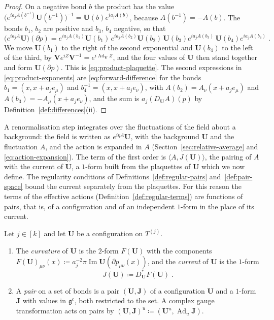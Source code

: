 \documentclass[11pt]{preprint}
\newcommand{\im}{\operatorname{Im}}
\newcommand{\Ad}{\operatorname{Ad}}
\numberwithin{equation}{section}
\begin{document}
\begin{proof}
On a negative bond $b$ the product has the value $\bigl(e^{ia_jA(b^{-1})}\mathbf U(b^{-1})\bigr)^{-1} = \mathbf U(b)e^{ia_jA(b)}$, because $A(b^{-1}) = -A(b)$. The bonds $b_1$, $b_2$ are positive and $b_3$, $b_4$ negative, so that
\[
    \bigl(e^{ia_jA}\mathbf U\bigr)(\partial p) = e^{ia_jA(b_1)}\mathbf U(b_1)\,e^{ia_jA(b_2)}\mathbf U(b_2)\,\mathbf U(b_3)e^{ia_jA(b_3)}\,\mathbf U(b_4)e^{ia_jA(b_4)}\;.
\]
We move $\mathbf U(b_1)$ to the right of the second exponential and $\mathbf U(b_4)$ to the left of the third, by $\mathbf Ve^{iZ}\mathbf V^{-1} = e^{i\Ad_{\mathbf V}Z}$, and the four values of $\mathbf U$ then stand together and form $\mathbf U(\partial p)$. This is \eqref{eq:product-plaquette}. The second expressions in \eqref{eq:product-exponents} are \eqref{eq:forward-difference} for the bonds $b_1 = (x, x + a_je_\mu)$ and $b_4^{-1} = (x, x + a_je_\nu)$, with $A(b_2) = A_\nu(x + a_je_\mu)$ and $A(b_3) = -A_\mu(x + a_je_\nu)$, and the sum is $a_j(D_{\mathbf U}A)(p)$ by Definition~\ref{def:differences}(ii).
\end{proof}

A renormalisation step integrates over the fluctuations of the field about a background: the field is written as $e^{i\eta A}\mathbf U$, with the background $\mathbf U$ and the fluctuation $A$, and the action is expanded in $A$ (Section~\ref{sec:relative-average} and \eqref{eq:action-expansion}). The term of the first order is $\langle A, J(\mathbf U)\rangle$, the pairing of $A$ with the current of $\mathbf U$, a $1$-form built from the plaquettes of $\mathbf U$ which we now define. The regularity conditions of Definitions~\ref{def:regular-pairs} and~\ref{def:pair-space} bound the current separately from the plaquettes. For this reason the terms of the effective actions (Definition~\ref{def:regular-terms}) are functions of pairs, that is, of a configuration and of an independent $1$-form in the place of its current.

\begin{definition}\label{def:current}
Let $j \in [k]$ and let $\mathbf U$ be a configuration on $T^{(j)}$.
\begin{enumerate}[label=(\roman*)]
\item The \emph{curvature} of $\mathbf U$ is the $2$-form $F(\mathbf U)$ with the components $F(\mathbf U)_{\mu\nu}(x) \coloneqq a_j^{-2}\pi\im\mathbf U(\partial p_{\mu\nu}(x))$, and the \emph{current} of $\mathbf U$ is the $1$-form
\begin{equation}\label{eq:current}
    J(\mathbf U) \coloneqq D^*_{\mathbf U}F(\mathbf U)\;.
\end{equation}
\item A \emph{pair} on a set of bonds is a pair $(\mathbf U, \mathbf J)$ of a configuration $\mathbf U$ and a $1$-form $\mathbf J$ with values in $\mathfrak g^c$, both restricted to the set. A complex gauge transformation acts on pairs by $(\mathbf U, \mathbf J)^u \coloneqq (\mathbf U^u, \Ad_u\mathbf J)$.
\end{enumerate}
\end{definition}
\end{document}
